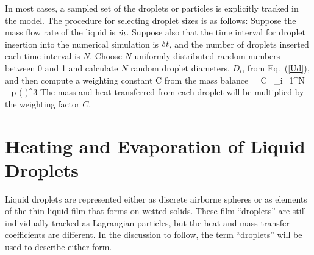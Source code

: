 In most cases, a sampled set of the droplets or particles is explicitly tracked in the model.
The procedure for selecting droplet sizes is as follows:
Suppose the mass flow rate of the liquid is $\dot{m}$.
Suppose also that the time interval for droplet insertion
into the numerical simulation is $\delta t$, and the number of droplets
inserted each time interval is $N$. Choose $N$ uniformly distributed random
numbers between 0 and 1 and calculate $N$ random droplet diameters, $D_i$, from Eq.~(\ref{Ud}), and then compute
a weighting constant C from the mass balance
\be \dm \; \dt = C \, \sum_{i=1}^N \;   \pi \rho_{\rm p}
      \left(  \right)^3 \ee
The mass and heat transferred from each droplet will be multiplied by
the weighting factor $C$.


\section{Heating and Evaporation of Liquid Droplets}

Liquid droplets are represented either as discrete airborne spheres or as elements of the thin liquid film that forms on wetted solids. These film ``droplets'' are still individually tracked as Lagrangian particles, but the heat and mass transfer coefficients are different. In the discussion to follow, the term ``droplets'' will be used to describe either form.

